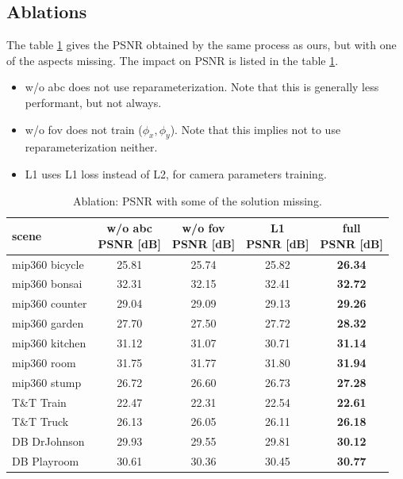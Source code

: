 \documentclass{article}
\begin{document}
\subsection{Ablations}

The table \ref{table:ablation} gives the PSNR obtained by the same process as ours, but with one of the aspects missing.
The impact on PSNR is listed in the table \ref{table:ablation}.
\begin{itemize}
	\item w/o abc does not use reparameterization. Note that this is generally less performant, but not always.
	\item w/o fov does not train ($\phi_x, \phi_y$). Note that this implies not to use reparameterization neither.
	\item L1 uses L1 loss instead of L2, for camera parameters training.
\end{itemize}	

\begin{table}[h]
	\begin{center}
	{
	\begin{tabular}{|p{3cm}|c|c|c|c|}
				\hline
				scene & \shortstack{w/o abc \\ PSNR [dB]} & \shortstack{w/o fov \\ PSNR [dB]} & \shortstack{L1 \\ PSNR [dB]} & \shortstack{full \\ PSNR [dB]} \\
				\hline
				mip360 bicycle & 25.81 & 25.74 & 25.82 & \textbf{26.34} \\
				mip360 bonsai & 32.31 & 32.15 & 32.41 & \textbf{32.72} \\
				mip360 counter & 29.04 & 29.09 & 29.13 & \textbf{29.26} \\
				mip360 garden & 27.70 & 27.50 & 27.72 & \textbf{28.32} \\
				mip360 kitchen & 31.12 & 31.07 & 30.71 & \textbf{31.14} \\
				mip360 room & 31.75 & 31.77 & 31.80 & \textbf{31.94} \\
				mip360 stump & 26.72 & 26.60 & 26.73 & \textbf{27.28} \\
				T\&T Train & 22.47 & 22.31 & 22.54 & \textbf{22.61} \\
				T\&T Truck & 26.13 & 26.05 & 26.11 & \textbf{26.18} \\
				DB DrJohnson & 29.93 & 29.55 & 29.81 & \textbf{30.12} \\
				DB Playroom & 30.61 & 30.36 & 30.45 & \textbf{30.77} \\
				\hline
			\end{tabular}
	}
	\caption{Ablation: PSNR with some of the solution missing.}
	\label{table:ablation}
	\end{center}
\end{table}
\end{document}
